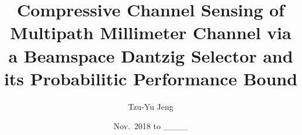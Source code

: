 \usepackage{mathtools}
\usepackage{amssymb}
\usepackage{graphicx}
\usepackage[linkcolor=blue]{hyperref}
\usepackage{xcolor}
\usepackage[ocgcolorlinks]{ocgx2}
\usepackage{stackengine}
\usepackage[a4paper, margin=3cm, footskip=0.25in] {geometry}

\setcounter{section}{-1}

\author{Tzu-Yu Jeng}
\date{Nov.\ 2018 to \_\_\_\_}

\title{Compressive Channel Sensing of Multipath Millimeter Channel via a Beamspace Dantzig Selector and its Probabilitic Performance Bound}

\newcommand{\Disp}[1]{\begin{align} #1 \end{align}}

\renewcommand{\H}{\dagger}
\newcommand{\Tr}{\intercal}
\newcommand{\NT}{\notag}
\renewcommand{\d}{\delta}
\newcommand{\f}{\varphi}
\renewcommand{\th}{\vartheta}

\newcommand{\MB}[1]{\mathbb{#1}}
\newcommand{\MC}[1]{\mathcal{#1}}
\newcommand{\MF}[1]{\mathfrak{#1}}
\newcommand{\RM}[1]{\mathrm{#1}}

\newcommand{\RB}[1]{ \left( #1 \right) }
\newcommand{\SB}[1]{ \left[ #1 \right] }
\newcommand{\CB}[1]{ \left{ #1 \right} }
\newcommand{\DB}[1]{ \left[ \! \left[ #1 \right] \! \right] }
\newcommand{\Nm}[1]{ \left| #1 \right| }

\newcommand{\R}[1]{\sqrt{#1}}
\newcommand{\F}[1]{\frac{#1}}
\newcommand{\V}[1]{\stackunder[1.2pt]{$#1$}{\rule{.9ex}{.075ex}}}
\newcommand{\M}[1]{\V{\V{#1}}}
\newcommand{\T}[1]{\tilde{#1}}
\newcommand{\IP}[1]{\langle #1 \rangle}

\newcommand{\myCount}
{
   \stepcounter{NumResult}
   \textbf{\arabic{NumResult}}
}

\newcommand {\Result} [2]
{
   \bigskip
   \myCount \textbf{#1} \par
   {#2} \par
   \vspace{-1em}
   \hfill \(\blacksquare\)
}

